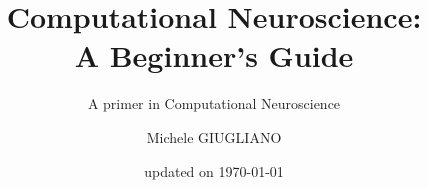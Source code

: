\documentclass[graybox,envcountchap,sectrefs]{svmono}
\date{updated on \today}
\begin{document}
\author{Michele GIUGLIANO}
\title{Computational Neuroscience:\\ A Beginner's Guide}
\subtitle{A primer in Computational Neuroscience}
\maketitle

\frontmatter%







\tableofcontents



\mainmatter%












\backmatter%

%
\printindex

\end{document}
